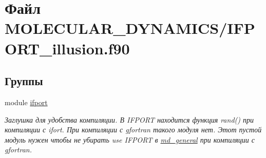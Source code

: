 \hypertarget{_i_f_p_o_r_t__illusion_8f90}{}\section{Файл M\+O\+L\+E\+C\+U\+L\+A\+R\+\_\+\+D\+Y\+N\+A\+M\+I\+C\+S/\+I\+F\+P\+O\+R\+T\+\_\+illusion.f90}
\label{_i_f_p_o_r_t__illusion_8f90}
\subsection*{Группы}
\begin{DoxyCompactItemize}
\item 
module \mbox{\hyperlink{namespaceifport}{ifport}}
\begin{DoxyCompactList}\small\item\em Заглушка для удобства компиляции.  В I\+F\+P\+O\+RT находится функция rand() при компиляции с ifort. При компиляции с gfortran такого модуля нет. Этот пустой модуль нужен чтобы не убирать use I\+F\+P\+O\+RT в \mbox{\hyperlink{namespacemd__general}{md\+\_\+general}} при компиляции с gfortran. \end{DoxyCompactList}\end{DoxyCompactItemize}
